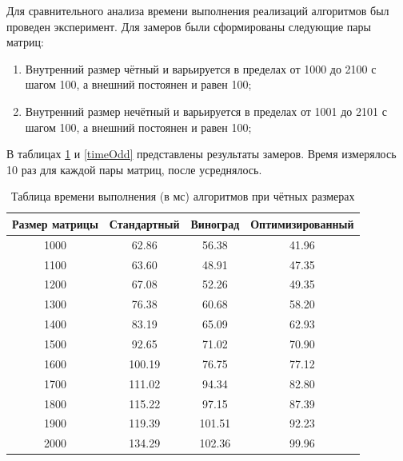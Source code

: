 \documentclass[12pt]{report}
\begin{document}
Для сравнительного анализа времени выполнения реализаций алгоритмов был проведен эксперимент. Для замеров были сформированы следующие пары матриц:
\begin{enumerate}
	\item Внутренний размер чётный и варьируется в пределах от 1000 до 2100 с шагом 100, а внешний постоянен и равен 100;
	\item Внутренний размер нечётный и варьируется в пределах от 1001 до 2101 с шагом 100, а внешний постоянен и равен 100;
\end{enumerate}

В таблицах \ref{timeEven} и \ref{timeOdd} представлены результаты замеров. Время измерялось 10 раз для каждой пары матриц, после усреднялось. 

\begin{table} [h!]
    \label{timeEven}
	\caption{Таблица времени выполнения (в мс) алгоритмов при чётных размерах}
	\begin{center}
		\begin{tabular}{|c c c c|} 
		\hline
		Размер матрицы & Стандартный & Виноград & Оптимизированный \\  
		\hline
        1000 & 62.86 & 56.38 & 41.96  \\ 
        \hline
        1100 & 63.60 & 48.91 & 47.35  \\ 
        \hline
        1200 & 67.08 & 52.26 & 49.35  \\ 
        \hline
        1300 & 76.38 & 60.68 & 58.20  \\ 
        \hline
        1400 & 83.19 & 65.09 & 62.93  \\ 
        \hline
        1500 & 92.65 & 71.02 & 70.90  \\ 
        \hline
        1600 & 100.19 & 76.75 & 77.12  \\ 
        \hline
        1700 & 111.02 & 94.34 & 82.80  \\ 
        \hline
        1800 & 115.22 & 97.15 & 87.39  \\ 
        \hline
        1900 & 119.39 & 101.51 & 92.23  \\ 
        \hline
        2000 & 134.29 & 102.36 & 99.96  \\ 
        \hline
		\end{tabular}
	\end{center}
\end{table}
\end{document}
